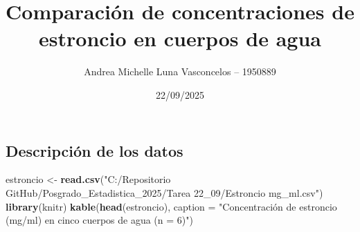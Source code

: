 \documentclass[
]{article}
\title{Comparación de concentraciones de estroncio en cuerpos de agua}
\author{Andrea Michelle Luna Vasconcelos -- 1950889}
\date{22/09/2025}
\newenvironment{Shaded}{\begin{snugshade}}{\end{snugshade}}
\newcommand{\AttributeTok}[1]{\textcolor[rgb]{0.13,0.29,0.53}{#1}}
\newcommand{\FunctionTok}[1]{\textcolor[rgb]{0.13,0.29,0.53}{\textbf{#1}}}
\newcommand{\NormalTok}[1]{#1}
\newcommand{\OtherTok}[1]{\textcolor[rgb]{0.56,0.35,0.01}{#1}}
\newcommand{\StringTok}[1]{\textcolor[rgb]{0.31,0.60,0.02}{#1}}
\begin{document}
\maketitle

\subsection{Descripción de los datos}\label{descripciuxf3n-de-los-datos}

\begin{Shaded}
\begin{Highlighting}[]
\NormalTok{estroncio }\OtherTok{\textless{}{-}} \FunctionTok{read.csv}\NormalTok{(}\StringTok{"C:/Repositorio GitHub/Posgrado\_Estadistica\_2025/Tarea 22\_09/Estroncio mg\_ml.csv"}\NormalTok{)}
\FunctionTok{library}\NormalTok{(knitr)}
\FunctionTok{kable}\NormalTok{(}\FunctionTok{head}\NormalTok{(estroncio), }\AttributeTok{caption =} \StringTok{"Concentración de estroncio (mg/ml) en cinco cuerpos de agua (n = 6)"}\NormalTok{)}
\end{Highlighting}
\end{Shaded}
\end{document}
